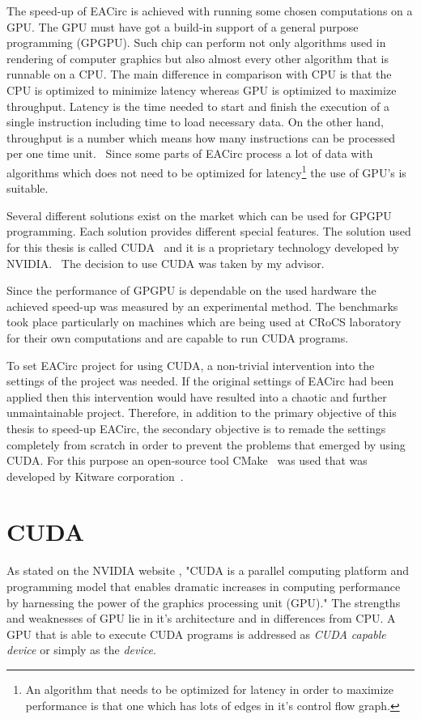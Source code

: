 \documentclass[12pt,oneside]{fithesis2}
\begin{document}
The speed-up of EACirc is achieved with running some chosen computations on a GPU. The GPU must have got a build-in support of a general purpose programming (GPGPU). Such chip can perform not only algorithms used in rendering of computer graphics but also almost every other algorithm that is runnable on a CPU. The main difference in comparison with CPU is that the CPU is optimized to minimize latency whereas GPU is optimized to maximize throughput. Latency is the time needed to start and finish the execution of a single instruction including time to load necessary data. On the other hand, throughput\label{throughput} is a number which means how many instructions can be processed per one time unit.~\cite{professional_cuda} Since some parts of EACirc process a lot of data with algorithms which does not need to be optimized for latency\footnote{An algorithm that needs to be optimized for latency in order to maximize performance is that one which has lots of edges in it's control flow graph.} the use of GPU's is suitable.

Several different solutions exist on the market which can be used for GPGPU programming. Each solution provides different special features. The solution used for this thesis is called CUDA~\cite{about_cuda} and it is a proprietary technology developed by NVIDIA.~\cite{nvidia} The decision to use CUDA was taken by my advisor.

Since the performance of GPGPU is dependable on the used hardware the achieved speed-up was measured by an experimental method. The benchmarks took place particularly on machines which are being used at CRoCS laboratory for their own computations and are capable to run CUDA programs.

\bigskip

To set EACirc project for using CUDA, a non-trivial intervention into the settings of the project was needed. If the original settings of EACirc had been applied then this intervention would have resulted into a chaotic and further unmaintainable project. Therefore, in addition to the primary objective of this thesis to speed-up EACirc, the secondary objective is to remade the settings completely from scratch in order to prevent the problems that emerged by using CUDA. For this purpose an open-source tool CMake~\cite{cmake} was used that was developed by Kitware corporation~\cite{kitware}.





\chapter{CUDA}
As stated on the NVIDIA website \cite{about_cuda}, "CUDA is a parallel computing platform and programming model that enables dramatic increases in computing performance by harnessing the power of the graphics processing unit (GPU)." The strengths and weaknesses of GPU lie in it's architecture and in differences from CPU. A GPU that is able to execute CUDA programs is addressed as \emph{CUDA capable device} or simply as the \emph{device}.
\end{document}
